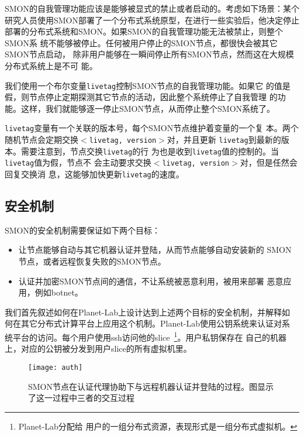 SMON的自我管理功能应该是能够被显式的禁止或者启动的。考虑如下场景：某个
研究人员使用SMON部署了一个分布式系统原型，在进行一些实验后，他决定停止
部署的分布式系统和SMON。如果SMON的自我管理功能无法被禁止，则整个SMON系
统不能够被停止。任何被用户停止的SMON节点，都很快会被其它SMON节点启动，
除非用户能够在一瞬间停止所有SMON节点，然而这在大规模分布式系统上是不可
能。

我们使用一个布尔变量\texttt{livetag}控制SMON节点的自我管理功能。如果它
的值是假，则节点停止定期探测其它节点的活动，因此整个系统停止了自我管理
的功能。这样，我们就能够逐一停止SMON节点，从而停止整个SMON系统了。

\texttt{livetag}变量有一个关联的版本号，每个SMON节点维护着变量的一个复
本。两个随机节点会定期交换\texttt{$<$livetag, version$>$}对，并且更新
\texttt{livetag}到最新的版本。需要注意到，节点交换\texttt{livetag}的行
为也是收到\texttt{livetag}值的控制的。当\texttt{livetag}值为假，节点不
会主动要求交换\texttt{$<$livetag, version$>$}对，但是任然会回复交换消
息，这能够加快更新\texttt{livetag}的速度。

\subsection{安全机制}
\label{subsec:security}

SMON的安全机制需要保证如下两个目标：

\begin{itemize}

  \item 让节点能够自动与其它机器认证并登陆，从而节点能够自动安装新的
  SMON节点，或者远程恢复失败的SMON节点。

  \item 认证并加密SMON节点间的通信，不让系统被恶意利用，被用来部署
  恶意应用，例如botnet。

\end{itemize}

我们首先叙述如何在Planet-Lab上设计达到上述两个目标的安全机制，并解释如
何在其它分布式计算平台上应用这个机制。Planet-Lab使用公钥系统来认证对系
统平台的访问。每个用户使用ssh访问他的slice~\footnote{Planet-Lab分配给
用户的一组分布式资源，表现形式是一组分布式虚拟机。}。用户私钥保存在
自己的机器上，对应的公钥被分发到用户slice的所有虚拟机里。

\begin{figure}
\centering
  \begin{minipage}{0.8\linewidth}
    \centering
    \texttt{[image: auth]}
    \caption{SMON节点在认证代理协助下与远程机器认证并登陆的过程。图显示
    了这一过程中三者的交互过程}
    \label{fig:auth}
  \end{minipage}
\end{figure}

